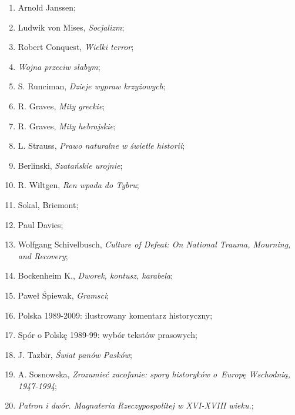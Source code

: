 \documentclass[a4paper,11pt]{article}
\begin{document}
\begin{enumerate}
\item Arnold Janssen;

\item Ludwik von Mises, \emph{Socjalizm};

\item Robert Conquest, \emph{Wielki terror};

\item \emph{Wojna przeciw słabym};

\item S. Runciman, \emph{Dzieje wypraw krzyżowych};

\item R. Graves, \emph{Mity greckie};

\item R. Graves, \emph{Mity hebrajskie};

\item L. Strauss, \emph{Prawo naturalne w świetle historii};

\item Berlinski, \emph{Szatańskie urojnie};

\item R. Wiltgen, \emph{Ren wpada do Tybru};

\item Sokal, Briemont;

\item Paul Davies;

\item Wolfgang Schivelbusch, \emph{Culture of Defeat: On National
    Trauma, Mourning, and Recovery};

\item Bockenheim K., \emph{Dworek, kontusz, karabela};

\item Paweł Śpiewak, \emph{Gramsci};

\item Polska 1989-2009: ilustrowany komentarz historyczny;

\item Spór o Polskę 1989-99: wybór tekstów prasowych;

\item J. Tazbir, \emph{Świat panów Pasków};

\item A. Sosnowska, \emph{Zrozumieć zacofanie: spory historyków
    o~Europę Wschodnią, 1947-1994};

\item \emph{Patron i dwór. Magnateria Rzeczypospolitej w XVI-XVIII
    wieku.};


\end{enumerate}
\end{document}
